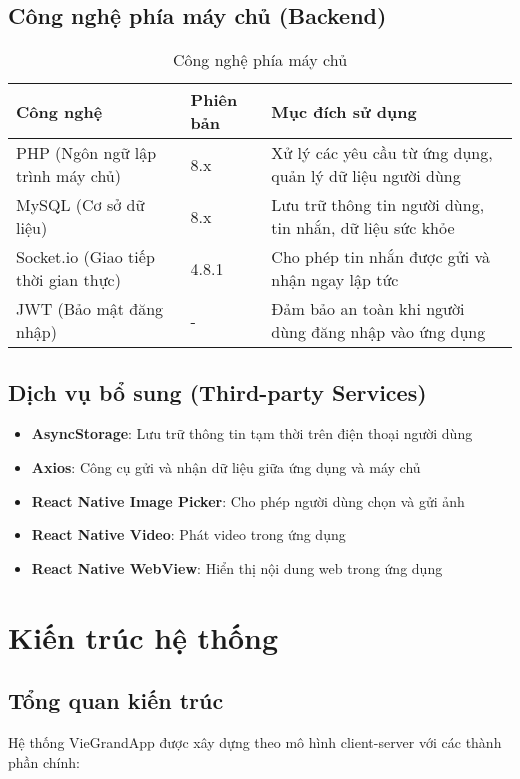 \documentclass[12pt,a4paper]{article}
\begin{document}
\subsection{Công nghệ phía máy chủ (Backend)}
\begin{table}[H]
\centering
\begin{tabular}{|p{4cm}|p{3cm}|p{8cm}|}
\hline
\textbf{Công nghệ} & \textbf{Phiên bản} & \textbf{Mục đích sử dụng} \\
\hline
PHP (Ngôn ngữ lập trình máy chủ) & 8.x & Xử lý các yêu cầu từ ứng dụng, quản lý dữ liệu người dùng \\
\hline
MySQL (Cơ sở dữ liệu) & 8.x & Lưu trữ thông tin người dùng, tin nhắn, dữ liệu sức khỏe \\
\hline
Socket.io (Giao tiếp thời gian thực) & 4.8.1 & Cho phép tin nhắn được gửi và nhận ngay lập tức \\
\hline
JWT (Bảo mật đăng nhập) & - & Đảm bảo an toàn khi người dùng đăng nhập vào ứng dụng \\
\hline
\end{tabular}
\caption{Công nghệ phía máy chủ}
\end{table}

\subsection{Dịch vụ bổ sung (Third-party Services)}
\begin{itemize}[leftmargin=2cm]
    \item \textbf{AsyncStorage}: Lưu trữ thông tin tạm thời trên điện thoại người dùng
    \item \textbf{Axios}: Công cụ gửi và nhận dữ liệu giữa ứng dụng và máy chủ
    \item \textbf{React Native Image Picker}: Cho phép người dùng chọn và gửi ảnh
    \item \textbf{React Native Video}: Phát video trong ứng dụng
    \item \textbf{React Native WebView}: Hiển thị nội dung web trong ứng dụng
\end{itemize}

\section{Kiến trúc hệ thống}

\subsection{Tổng quan kiến trúc}
Hệ thống VieGrandApp được xây dựng theo mô hình client-server với các thành phần chính:
\end{document}
